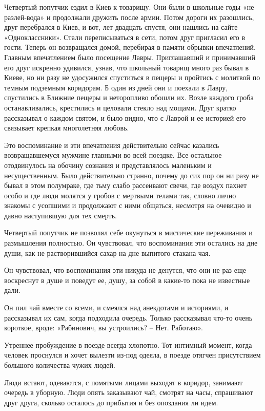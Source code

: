 Четвертый попутчик ездил в Киев к товарищу. Они были в школьные годы «не разлей-вода» и продолжали дружить после армии. Потом дороги их разошлись, друг перебрался в Киев, и вот, лет двадцать спустя, они нашлись на сайте «Одноклассники». Стали переписываться в сети, потом друг пригласил его в гости. Теперь он возвращался домой, перебирая в памяти обрывки впечатлений. Главным впечатлением было посещение Лавры. Приглашавший и принимавший его друг искренно удивился, узнав, что школьный товарищ много раз бывал в Киеве, но ни разу не удосужился спуститься в пещеры и пройтись с молитвой по темным подземным коридорам. Б один из дней они и поехали в Лавру, спустились в Ближние пещеры и неторопливо обошли их. Возле каждого гроба останавливались, крестились и целовали стекло над мощами. Друг кратко рассказывал о каждом святом, и было видно, что с Лаврой и ее историей его связывает крепкая многолетняя любовь.

Это воспоминание и эти впечатления действительно сейчас казались возвращавшемуся мужчине главными во всей поездке. Все остальное отодвинулось на обочину сознания и представлялось маленьким и несущественным. Было действительно странно, почему до сих пор он ни разу не бывал в этом полумраке, где тьму слабо рассеивают свечи, где воздух пахнет особо и где люди молятся у гробов с мертвыми телами так, словно лично знакомы с усопшими и продолжают с ними общаться, несмотря на очевидно и давно наступившую для тех смерть.

Четвертый попутчик не позволял себе окунуться в мистические переживания и размышления полностью. Он чувствовал, что воспоминания эти остались на дне души, как не растворившийся сахар на дне выпитого стакана чая.


Он чувствовал, что воспоминания эти никуда не денутся, что они не раз еще воскреснут в душе и поведут ее, душу, за собой в какие-то пока не известные дали.

Он пил чай вместе со всеми, и смеялся над анекдотами и историями, и рассказывал их сам, когда подходила очередь. Только рассказывал что-то очень короткое, вроде: «Рабинович, вы устроились? – Нет. Работаю».

Утреннее пробуждение в поезде всегда хлопотно. Тот интимный момент, когда человек проснулся и хочет вылезти из-под одеяла, в поезде отягчен присутствием большого количества чужих людей.

Люди встают, одеваются, с помятыми лицами выходят в коридор, занимают очередь в уборную. Люди опять заказывают чай, смотрят на часы, спрашивают друг друга, сколько осталось до прибытия и без опоздания ли идем.

